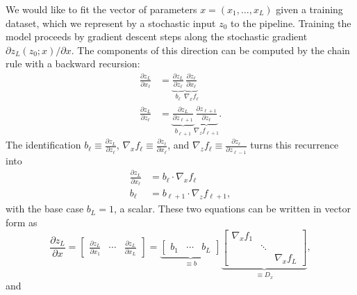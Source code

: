\documentclass{article}
\begin{document}
We would like to fit the vector of parameters $x = (x_1, \ldots, x_L)$ given a training dataset, which we represent by
a stochastic input $z_0$ to the pipeline. Training the model proceeds by gradient descent steps along the stochastic
gradient $\partial z_L(z_0;x) / \partial x$. The components of this direction can be computed by the chain rule with a
backward recursion:
\begin{align}
  \label{eq:backprop}
  \frac{\partial z_L}{\partial x_\ell} & = \underbrace{\frac{\partial z_L}{\partial z_{\ell}}}_{b_\ell} \underbrace{\frac{\partial z_\ell}{\partial x_\ell}}_{\nabla_x f_\ell}                \\
  \frac{\partial z_L}{\partial z_\ell} & = \underbrace{\frac{\partial z_L}{\partial z_{\ell+1}}}_{b_{\ell+1}} \underbrace{\frac{\partial z_{\ell+1}}{\partial z_\ell}}_{\nabla_z f_{\ell+1}}.
\end{align}
The identification $b_\ell \equiv \frac{\partial z_L}{\partial z_\ell}$, $\nabla_x f_\ell \equiv \frac{\partial z_\ell}{\partial x_\ell}$, and $\nabla_z f_\ell \equiv \frac{\partial z_\ell}{\partial z_{\ell-1}}$ turns this recurrence into
\begin{align}
  \frac{\partial z_L}{\partial x_\ell} & = b_\ell \cdot \nabla_x f_\ell          \\
  b_\ell                               & = b_{\ell+1} \cdot \nabla_z f_{\ell+1},
\end{align}
with the base case $b_L = 1$, a scalar.  These two equations can be written in vector form as
\begin{equation}
  \frac{\partial z_L}{\partial x} =
  \begin{bmatrix}
    \frac{\partial z_L}{\partial x_1} & \cdots & \frac{\partial z_L}{\partial x_L}
  \end{bmatrix}
  =
  \underbrace{
    \begin{bmatrix}
      b_1 & \cdots & b_L
    \end{bmatrix}
  }_{\equiv b}
  \underbrace{
    \begin{bmatrix}
      \nabla_x f_1 &                       \\
                   & \ddots                \\
                   &        & \nabla_x f_L
    \end{bmatrix}
  }_{\equiv D_x},
\end{equation}
and
\end{document}
